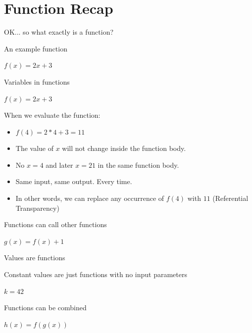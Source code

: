 \documentclass{beamer}
\begin{document}
\section{Function Recap}

\begin{frame}{}
OK... so what exactly is a function?
\end{frame}

\begin{frame}{An example function}

  {\Huge $f(x) = 2x + 3$}

\end{frame}

\begin{frame}{Variables in functions}

  {\Huge $f(x) = 2x + 3$}

  \vskip5mm

When we evaluate the function:
  \begin{itemize}[<+->]
    \item $f(4) = 2*4 + 3 = 11$
    \item The value of $x$ will not change inside the function body.
    \item No $x = 4$ and later $x = 21$ in the same function body.
    \item Same input, same output. Every time.
    \item In other words, we can replace any occurrence of $f(4)$ with
      $11$ (Referential Transparency)
  \end{itemize}
\end{frame}


\begin{frame}{Functions can call other functions}

  {\Huge $g(x) = f(x) + 1$}

\end{frame}

\begin{frame}{Values are functions}

  {\large Constant values are just functions with no input parameters}

  \vskip5mm

  {\Huge $k = 42$}

\end{frame}

\begin{frame}{Functions can be combined}

  {\Huge $h(x) = f(g(x))$}

\end{frame}
\end{document}
